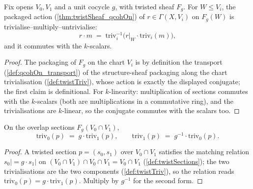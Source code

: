 \begin{lemma}
  \label{lem:twistSheaf_qsmul_eq}
  \leanok
  Fix opens \(V_0, V_1\) and a unit cocycle \(g\), with twisted sheaf \(F_g\). For
  \(W \le V_i\), the packaged action (\ref{thm:twistSheaf_qcohOn}) of
  \(r \in \Gamma(X, V_i)\) on \(F_g(W)\) is
  trivialise--multiply--untrivialise:
  \[
    r \cdot m \;=\; \mathrm{triv}_i^{-1}\bigl(r|_W \cdot \mathrm{triv}_i(m)\bigr),
  \]
  and it commutes with the \(k\)-scalars.
\end{lemma}
\begin{proof}
  \leanok
  The packaging of \(F_g\) on the chart \(V_i\) is by definition the transport
  (\ref{def:qcohOn_transport}) of the structure-sheaf packaging along the chart
  trivialisation (\ref{def:twistTriv}), whose action is exactly the displayed conjugate;
  the first claim is definitional. For \(k\)-linearity: multiplication of sections
  commutes with the \(k\)-scalars (both are multiplications in a commutative ring), and
  the trivialisations are \(k\)-linear, so the conjugate commutes with the scalars too.
\end{proof}

\begin{lemma}
  \label{lem:twistTriv_inf_eq}
  \leanok
  On the overlap sections \(F_g(V_0 \cap V_1)\),
  \[
    \mathrm{triv}_0(p) \;=\; g \cdot \mathrm{triv}_1(p), \qquad
    \mathrm{triv}_1(p) \;=\; g^{-1} \cdot \mathrm{triv}_0(p).
  \]
\end{lemma}
\begin{proof}
  \leanok
  A twisted section \(p = (s_0, s_1)\) over \(V_0 \cap V_1\) satisfies the matching
  relation \(s_0| = g \cdot s_1|\) on \((V_0 \cap V_1) \cap V_0 \cap V_1 = V_0 \cap
  V_1\) (\ref{def:twistSections}); the two trivialisations are the two components
  (\ref{def:twistTriv}), so the relation reads \(\mathrm{triv}_0(p) = g \cdot
  \mathrm{triv}_1(p)\). Multiply by \(g^{-1}\) for the second form.
\end{proof}

